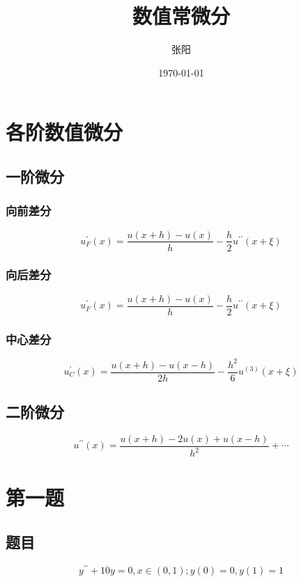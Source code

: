 \documentclass{ctexart}
\author{张阳}
\date{\today}
\title{数值常微分}
\numberwithin{equation}{section}
\begin{document}
\maketitle
\tableofcontents
\newpage
\section{各阶数值微分}
\subsection{一阶微分}
\subsubsection{向前差分}
\[u_{F}^{\prime}(x)=\dfrac{u(x+h)-u(x)}{h}-\dfrac{h}{2} u^{\prime \prime}(x+\xi)\]
\subsubsection{向后差分}
\[u_{F}^{\prime}(x)=\dfrac{u(x+h)-u(x)}{h}-\dfrac{h}{2} u^{\prime \prime}(x+\xi)\]
\subsubsection{中心差分}
\[u_{C}^{\prime}(x)=\dfrac{u(x+h)-u(x-h)}{2 h}-\dfrac{h^{2}}{6} u^{(3)}(x+\xi)\]
\subsection{二阶微分}
\[u^{\prime \prime}(x)=\dfrac{u(x+h)-2 u(x)+u(x-h)}{h^{2}}+\cdots\]

\section{第一题}
\subsection{题目}
\[y^{\prime \prime}+10 y=0, x \in(0,1) ; y(0)=0, y(1)=1\]
\end{document}
